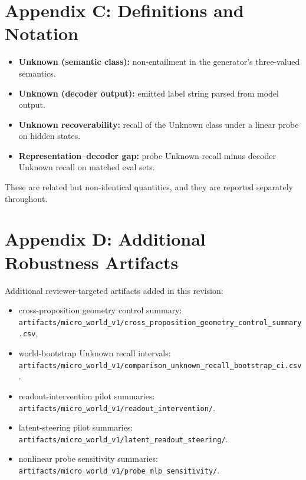 \documentclass[11pt]{article}
\begin{document}
\section{Appendix C: Definitions and Notation}
\begin{itemize}
  \item \textbf{Unknown (semantic class):} non-entailment in the generator's three-valued semantics.
  \item \textbf{Unknown (decoder output):} emitted label string parsed from model output.
  \item \textbf{Unknown recoverability:} recall of the Unknown class under a linear probe on hidden states.
  \item \textbf{Representation--decoder gap:} probe Unknown recall minus decoder Unknown recall on matched eval sets.
\end{itemize}
These are related but non-identical quantities, and they are reported separately throughout.

\section{Appendix D: Additional Robustness Artifacts}
Additional reviewer-targeted artifacts added in this revision:
\begin{itemize}
  \item cross-proposition geometry control summary: \texttt{artifacts/micro\_world\_v1/cross\_proposition\_geometry\_control\_summary.csv},
  \item world-bootstrap Unknown recall intervals: \texttt{artifacts/micro\_world\_v1/comparison\_unknown\_recall\_bootstrap\_ci.csv}.
  \item readout-intervention pilot summaries: \texttt{artifacts/micro\_world\_v1/readout\_intervention/}.
  \item latent-steering pilot summaries: \texttt{artifacts/micro\_world\_v1/latent\_readout\_steering/}.
  \item nonlinear probe sensitivity summaries: \texttt{artifacts/micro\_world\_v1/probe\_mlp\_sensitivity/}.
\end{itemize}
\end{document}
